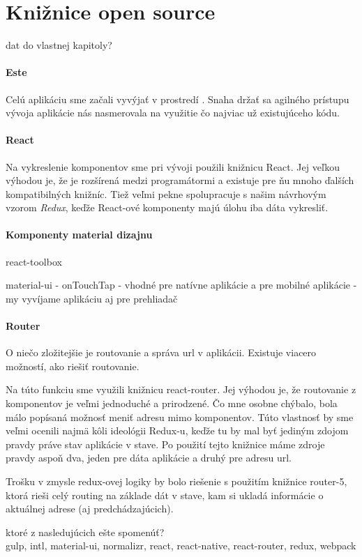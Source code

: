 \section{Knižnice open source}%
\TODO{} dat do vlastnej kapitoly?

\paragraph{Este}
Celú aplikáciu sme začali vyvýjať v prostredí \cite[este]{Este}. Snaha držať sa agilného prístupu vývoja aplikácie nás nasmerovala na využitie čo najviac už existujúceho kódu. %

\paragraph{React}
Na vykreslenie komponentov sme pri vývoji použili knižnicu React. Jej veľkou výhodou je, že je rozšírená medzi programátormi a existuje pre ňu mnoho ďalších kompatibilných knižníc. Tiež veľmi pekne spolupracuje s našim návrhovým vzorom \emph{Redux}, keďže React-ové komponenty majú úlohu iba dáta vykresliť.

\paragraph{Komponenty material dizajnu}
\TODO{}

react-toolbox

material-ui
- onTouchTap
- vhodné pre natívne aplikácie a pre mobilné aplikácie
- my vyvíjame aplikáciu aj pre prehliadač

\paragraph{Router}%
O niečo zložitejšie je routovanie a správa url v aplikácii. Existuje viacero možností, ako riešiť routovanie. 

Na túto funkciu sme využili knižnicu react-router. Jej výhodou je, že routovanie z komponentov je veľmi jednoduché a prirodzené. Čo mne osobne chýbalo, bola málo popísaná možnosť meniť adresu mimo komponentov. Túto vlastnosť by sme veľmi ocenili najmä kôli ideológii Redux-u, keďže tu by mal byť jediným zdojom pravdy práve stav aplikácie v stave. Po použití tejto knižnice máme zdroje pravdy aspoň dva, jeden pre dáta aplikácie a druhý pre adresu url. %

Trošku  v zmysle redux-ovej logiky by bolo riešenie s použitím knižnice router-5, ktorá rieši celý routing na základe dát v stave, kam si ukladá informácie o aktuálnej adrese (aj predchádzajúcich).

\cite[Redux]{Redux}

\TODO{} ktoré z nasledujúcich ešte spomenúť?\\
gulp, intl, material-ui, normalizr, react, react-native, react-router, redux, webpack